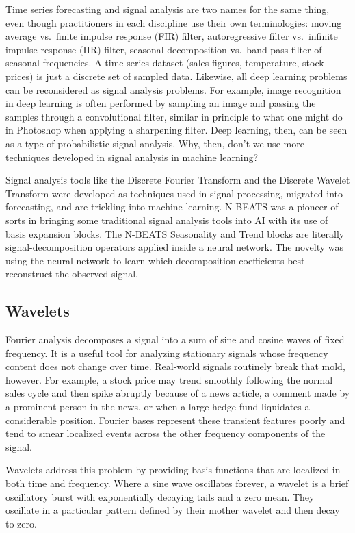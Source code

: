 \documentclass{article}
\begin{document}
Time series forecasting and signal analysis are two names for the same thing, even though practitioners in each discipline use their own terminologies: moving average vs.\ finite impulse response (FIR) filter, autoregressive filter vs.\ infinite impulse response (IIR) filter, seasonal decomposition vs.\ band-pass filter of seasonal frequencies. A time series dataset (sales figures, temperature, stock prices) is just a discrete set of sampled data. Likewise, all deep learning problems can be reconsidered as signal analysis problems. For example, image recognition in deep learning is often performed by sampling an image and passing the samples through a convolutional filter, similar in principle to what one might do in Photoshop when applying a sharpening filter. Deep learning, then, can be seen as a type of probabilistic signal analysis. Why, then, don't we use more techniques developed in signal analysis in machine learning?

Signal analysis tools like the Discrete Fourier Transform and the Discrete Wavelet Transform were developed as techniques used in signal processing, migrated into forecasting, and are trickling into machine learning. N-BEATS was a pioneer of sorts in bringing some traditional signal analysis tools into AI with its use of basis expansion blocks. The N-BEATS Seasonality and Trend blocks are literally signal-decomposition operators applied inside a neural network. The novelty was using the neural network to learn which decomposition coefficients best reconstruct the observed signal.

\subsection{Wavelets}

Fourier analysis decomposes a signal into a sum of sine and cosine waves of fixed frequency. It is a useful tool for analyzing stationary signals whose frequency content does not change over time. Real-world signals routinely break that mold, however. For example, a stock price may trend smoothly following the normal sales cycle and then spike abruptly because of a news article, a comment made by a prominent person in the news, or when a large hedge fund liquidates a considerable position. Fourier bases represent these transient features poorly and tend to smear localized events across the other frequency components of the signal.

Wavelets address this problem by providing basis functions that are localized in both time and frequency. Where a sine wave oscillates forever, a wavelet is a brief oscillatory burst with exponentially decaying tails and a zero mean. They oscillate in a particular pattern defined by their mother wavelet and then decay to zero.
\end{document}
